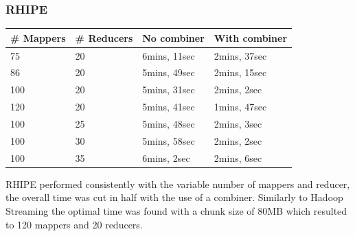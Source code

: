 \documentclass[
journal=jacsat, %
manuscript=article]{achemso}
\begin{document}
\subsubsection{RHIPE}
\begin{table}[H]
\begin{tabular}{ l | l | l | l }
\# Mappers & \# Reducers & No combiner & With combiner \\ \hline
 75 & 20 & 6mins, 11sec & 2mins, 37sec \\\hline
 86 & 20 & 5mins, 49sec &  2mins, 15sec \\\hline
 100 & 20 & 5mins, 31sec & 2mins, 2sec  \\\hline
 120 & 20 & 5mins, 41sec & 1mins, 47sec  \\\hline
 100 & 25 & 5mins, 48sec & 2mins, 3sec  \\\hline
 100 & 30 & 5mins, 58sec & 2mins, 2sec  \\\hline
 100 & 35 & 6mins, 2sec & 2mins, 6sec  \\
\end{tabular}
\end{table}
RHIPE performed consistently with the variable number of mappers and reducer, the overall time was cut in half with the use of a combiner. Similarly to Hadoop Streaming the optimal time was found with a chunk size of 80MB which resulted to 120 mappers and 20 reducers.
\end{document}
